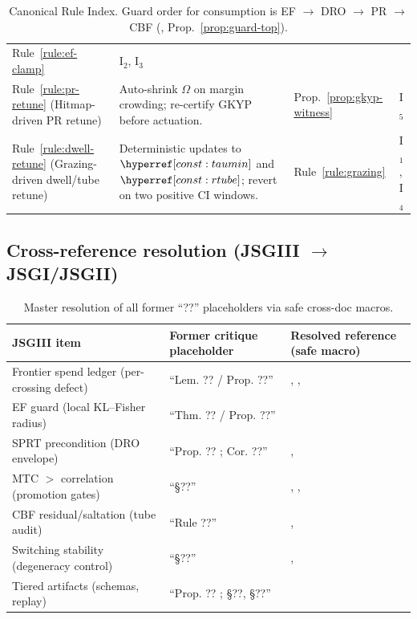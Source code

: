 \begin{table}[h]
\begin{tabularx}{\textwidth}{@{}>{\raggedright\arraybackslash}p{2.75cm} >{\raggedright\arraybackslash}X >{\raggedright\arraybackslash}p{2.1cm} >{\raggedright\arraybackslash}p{1.6cm}@{}}
Rule~\ref{rule:ef-clamp} &
I\(_2\), I\(_3\) \\
\addlinespace
Rule~\ref{rule:pr-retune} (Hitmap-driven PR retune) &
Auto-shrink $\Omega$ on margin crowding; re-certify GKYP before actuation. &
Prop.~\ref{prop:gkyp-witness} &
I\(_5\) \\
\addlinespace
Rule~\ref{rule:dwell-retune} (Grazing-driven dwell/tube retune) &
Deterministic updates to $\constref{taumin}$ and $\constref{rtube}$; revert on two positive CI windows. &
Rule~\ref{rule:grazing} &
I\(_1\), I\(_4\) \\
\bottomrule
\end{tabularx}
\caption{Canonical Rule Index. Guard order for consumption is EF $\rightarrow$ DRO $\rightarrow$ PR $\rightarrow$ CBF (, Prop.~\ref{prop:guard-top}).}
\label{tab:rule-index}
\end{table}

\subsection{Cross-reference resolution (JSGIII $\rightarrow$ JSGI/JSGII)}\label{app:resolution-xref}
\emph{}
\begin{table}[h]
\centering
\renewcommand{\arraystretch}{1.12}
\begin{tabularx}{\textwidth}{@{}>{\raggedright\arraybackslash}X >{\raggedright\arraybackslash}X >{\raggedright\arraybackslash}X@{}}
\toprule
\textbf{JSGIII item} & \textbf{Former critique placeholder} & \textbf{Resolved reference (safe macro)} \\
\midrule
Frontier spend ledger (per-crossing defect) &
“Lem. ?? / Prop. ??” &
\jsgiLem{\lblNoZeno}, \jsgiLem{\lblJacobiDefect}, \jsgiThm{\lblISS} \\
EF guard (local KL–Fisher radius) &
“Thm. ?? / Prop. ??” &
\jsgiiThm{\lblEFradius} \\
SPRT precondition (DRO envelope) &
“Prop. ?? ; Cor. ??” &
\jsgiiThm{\lblDROenv}, \jsgiiDef{\lblQuarantine} \\
MTC $>$ correlation (promotion gates) &
“§??” &
\jsgiiDef{\lblMTC}, \jsgiiDef{\lblIVbadge}, \jsgiiSec{\lblCoverage} \\
CBF residual/saltation (tube audit) &
“Rule ??” &
\jsgiiLem{\lblSaltation}, \jsgiiLem{\lblCBFfrontier} \\
Switching stability (degeneracy control) &
“§??” &
\jsgiiLem{\lblGapGate}, \jsgiiThm{\lblSwitchStab} \\
Tiered artifacts (schemas, replay) &
“Prop. ?? ; §??, §??” &
\jsgiiSec{\lblSchemas} \\
\bottomrule
\end{tabularx}
\caption{Master resolution of all former “??” placeholders via safe cross-doc macros.}
\label{tab:master-resolution}
\end{table}

